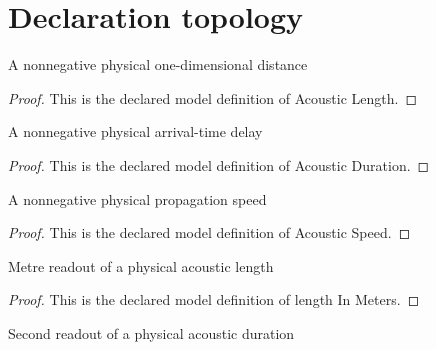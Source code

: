 \section{Declaration topology}
\begin{definition}
  \label{def:physics:phyx-mini-0308:phyxminiproblems-problemphyxmini0308-acousticlength}
  A nonnegative physical one-dimensional distance
\end{definition}
\begin{proof}
  This is the declared model definition of Acoustic Length.
\end{proof}
\begin{definition}
  \label{def:physics:phyx-mini-0308:phyxminiproblems-problemphyxmini0308-acousticduration}
  A nonnegative physical arrival-time delay
\end{definition}
\begin{proof}
  This is the declared model definition of Acoustic Duration.
\end{proof}
\begin{definition}
  \label{def:physics:phyx-mini-0308:phyxminiproblems-problemphyxmini0308-acousticspeed}
  A nonnegative physical propagation speed
\end{definition}
\begin{proof}
  This is the declared model definition of Acoustic Speed.
\end{proof}
\begin{definition}
  \label{def:physics:phyx-mini-0308:phyxminiproblems-problemphyxmini0308-lengthinmeters}
  Metre readout of a physical acoustic length
\end{definition}
\begin{proof}
  This is the declared model definition of length In Meters.
\end{proof}
\begin{definition}
  \label{def:physics:phyx-mini-0308:phyxminiproblems-problemphyxmini0308-durationinseconds}
  Second readout of a physical acoustic duration
\end{definition}
